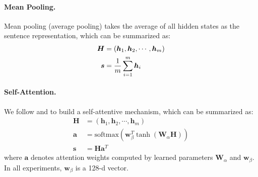 \documentclass[11pt,a4paper]{article}
\begin{document}
\paragraph{Mean Pooling.}
Mean pooling (average pooling) takes the average of all hidden states as the sentence representation, which can be summarized as: 
\begin{equation*}
\begin{aligned}
\bm{H} &= (\bm{h}_1, \bm{h}_2, \cdots, \bm{h}_{m}) \\
\bm{s} &= \frac{1}{m} \sum_{i=1}^m \hm{h}_i
\end{aligned}
\end{equation*}

\paragraph{Self-Attention.}
We follow  and  to build a self-attentive mechanism, which can be summarized as:
\begin{equation*}
\begin{aligned}
\bm{H} & = (\bm{h}_1, \bm{h}_2, \cdots, \bm{h}_{m}) \\
\bm{a} & = \mathrm{softmax}(\mathbf{w}_\beta^T \tanh (\mathbf{W}_\alpha \bm{H})) \\ 
\bm{s} & = \bm{H} \bm{a}^T
\end{aligned}
\end{equation*}
where $\bm{a}$ denotes attention weights computed by learned parameters $\mathbf{W}_\alpha$ and $\mathbf{w}_\beta$.
In all experiments, $\mathbf{w}_\beta$ is a 128-d vector. 
\end{document}
